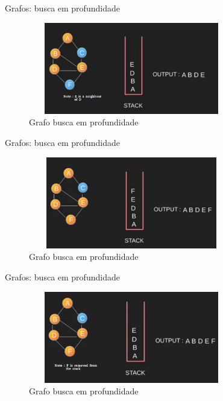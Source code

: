 \begin{frame}
	\begin{block}{Grafos: busca em profundidade}
		\begin{figure}[!htb]
			\centering	  
			\includegraphics[height=4cm, width = 9cm]{./pic/dfs5.png}
			\caption{Grafo busca em profundidade}
		\end{figure}
	\end{block}
\end{frame}

\begin{frame}
	\begin{block}{Grafos: busca em profundidade}
		\begin{figure}[!htb]
			\centering	  
			\includegraphics[height=4cm, width = 9cm]{./pic/dfs6.png}
			\caption{Grafo busca em profundidade}
		\end{figure}
	\end{block}
\end{frame}

\begin{frame}
	\begin{block}{Grafos: busca em profundidade}
		\begin{figure}[!htb]
			\centering	  
			\includegraphics[height=4cm, width = 9cm]{./pic/dfs7.png}
			\caption{Grafo busca em profundidade}
		\end{figure}
	\end{block}
\end{frame}

